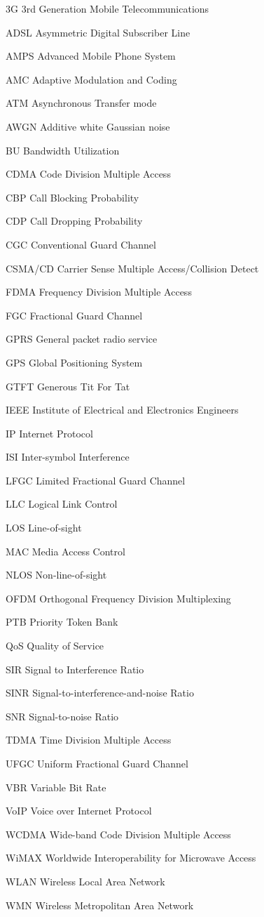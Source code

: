 \begin{denotation}
\item[3G] 3rd Generation Mobile Telecommunications
\item[ADSL] Asymmetric Digital Subscriber Line
\item[AMPS] Advanced Mobile Phone System
\item[AMC] Adaptive Modulation and Coding
\item[ATM]Asynchronous Transfer mode
\item[AWGN]  Additive white Gaussian noise
\item[BU] Bandwidth Utilization
\item[CDMA] Code Division Multiple Access 
\item[CBP] Call Blocking Probability
\item[CDP] Call Dropping Probability
\item[CGC] Conventional Guard Channel
\item[CSMA/CD] Carrier Sense Multiple Access/Collision Detect
\item[FDMA]Frequency Division Multiple Access
\item[FGC] Fractional Guard Channel
  \item[GPRS] General packet radio service
  \item[GPS] Global Positioning System
  \item[GTFT] Generous Tit For Tat
  \item[IEEE] Institute of Electrical and Electronics Engineers
  \item[IP] Internet Protocol
  \item[ISI] Inter-symbol Interference
  \item[LFGC] Limited Fractional Guard Channel
  \item[LLC] Logical Link Control
  \item[LOS] Line-of-sight
  \item[MAC] Media Access Control
  \item[NLOS] Non-line-of-sight
  \item[OFDM] Orthogonal Frequency Division Multiplexing 
  \item[PTB] Priority Token Bank
  \item[QoS] Quality of Service
  \item[SIR] Signal to Interference Ratio
  \item[SINR]Signal-to-interference-and-noise Ratio
  \item[SNR] Signal-to-noise Ratio
  \item[TDMA]Time Division Multiple Access
  \item[UFGC] Uniform Fractional Guard Channel
  \item[VBR] Variable Bit Rate
  \item[VoIP] Voice over Internet Protocol 
  \item[WCDMA] Wide-band Code Division Multiple Access
  \item[WiMAX] Worldwide Interoperability for Microwave Access
  \item[WLAN] Wireless Local Area Network
  \item[WMN] Wireless Metropolitan Area Network
\end{denotation}
